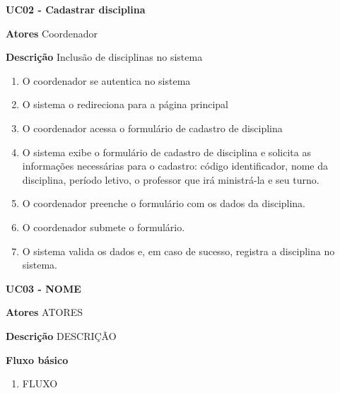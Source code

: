 \begin{description}
    \item \textbf{UC02 - Cadastrar disciplina}
        \begin{description}
            \item \textbf{Atores} Coordenador
            \item \textbf{Descrição} Inclusão de disciplinas no sistema
            \begin{enumerate}
                \item O coordenador se autentica no sistema
                \item O sistema o redireciona para a página principal
                \item O coordenador acessa o formulário de cadastro de disciplina
                \item O sistema exibe o formulário de cadastro de disciplina e solicita as informações necessárias para o cadastro: código identificador, nome da disciplina, período letivo, o professor que irá ministrá-la e seu turno.
                \item O coordenador preenche o formulário com os dados da disciplina.
                \item O coordenador submete o formulário.
                \item O sistema valida os dados e, em caso de sucesso, registra a disciplina no sistema.                
            \end{enumerate}
        \end{description}

        \item \textbf{UC03 - NOME}
        \begin{description}
            \item \textbf{Atores} ATORES
            \item \textbf{Descrição} DESCRIÇÃO
            \item \textbf{Fluxo básico}
            \begin{enumerate}
                \item FLUXO
            \end{enumerate}
        \end{description}
\end{description}

